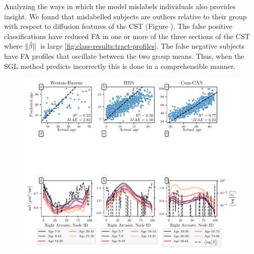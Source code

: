\documentclass[10pt,%
               aps,%
               prl,%
               reprint,%
               superscriptaddress,%
               preprintnumbers,%
               linenumbers,%
               amsmath,%
               floatfix]{revtex4-1}
\begin{document}
Analyzing the ways in which the model mislabels individuals also provides
insight. We found that mislabelled subjects are outliers relative to their
group with respect to diffusion features of the CST (Figure
).
The false positive classifications have reduced FA in one or more of the three
sections of the CST where $\norm*{\hat{\beta}}$ is large
\cref{fig:class-results:tract-profiles}. The false negative subjects have FA
profiles that oscillate between the two group means. Thus, when the SGL
method predicts incorrectly this is done in a comprehensible manner.

\begin{figure}
    \vspace{4.5cm}
    \vspace{-8.0cm}
    \includegraphics[width=\textwidth]{regression_scatter.pdf}

\end{figure}
\end{document}
